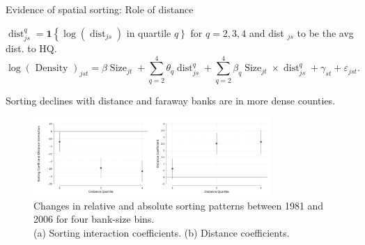 \documentclass[notes,10pt, aspectratio=169]{beamer}
\newenvironment{wideitemize}{\itemize\addtolength{\itemsep}{10pt}}{\enditemize}
\begin{document}
\begin{frame}{Evidence of spatial sorting: Role of distance}
    
    \begin{wideitemize}
        \item   $\operatorname{dist}_{j s}^q=\mathbf{1}\left\{\log \left(\operatorname{dist}_{j s}\right)\right.$ in quartile $\left.q\right\}$ for $q=2,3,4$ and dist $_{j s}$ to be the avg dist. to HQ.  %
    $$
    \log (\text { Density })_{j s t}=\beta \operatorname{Size}_{j t}+\sum_{q=2}^4 \theta_q \operatorname{dist}_{j s}^q+\sum_{q=2}^4 \beta_q \operatorname{Size}_{j t} \times \operatorname{dist}_{j s}^q+\gamma_{s t}+\varepsilon_{j s t} .
    $$
    \item Sorting declines with distance and faraway banks are in more dense counties. 

    \end{wideitemize}
    \begin{figure}
        \centering
        \includegraphics[width=0.8\textwidth]{imgs/fig8.png}
        \caption*{Changes in relative and absolute sorting patterns between 1981 and 2006 for
        four bank-size bins.\\ (a) Sorting interaction coefficients. (b) Distance coefficients.}
        \label{fig:my_label}
    \end{figure}

  


    
    \end{frame}
\end{document}
